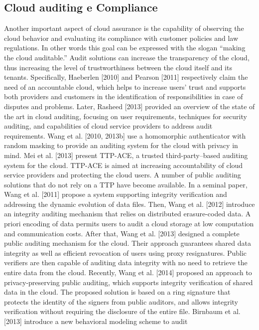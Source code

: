 \documentclass[../main.tex]{subfiles}
\begin{document}
\subsection {Cloud auditing e Compliance}
Another important aspect of cloud assurance is the capability of observing the cloud
behavior and evaluating its compliance with customer policies and law regulations. In
other words this goal can be expressed with the slogan “making the cloud auditable.”
Audit solutions can increase the transparency of the cloud, thus increasing the level of
trustworthiness between the cloud itself and its tenants. Specifically, Haeberlen [2010]
and Pearson [2011] respectively claim the need of an accountable cloud, which helps to
increase users’ trust and supports both providers and customers in the identification
of responsibilities in case of disputes and problems. Later, Rasheed [2013] provided
an overview of the state of the art in cloud auditing, focusing on user requirements,
techniques for security auditing, and capabilities of cloud service providers to address
audit requirements.
Wang et al. [2010, 2013b] use a homomorphic authenticator with random masking to
provide an auditing system for the cloud with privacy in mind. Mei et al. [2013] present
TTP-ACE, a trusted third-party–based auditing system for the cloud. TTP-ACE is
aimed at increasing accountability of cloud service providers and protecting the cloud
users. A number of public auditing solutions that do not rely on a TTP have become
available. In a seminal paper, Wang et al. [2011] propose a system supporting integrity
verification and addressing the dynamic evolution of data files. Then, Wang et al. [2012]
introduce an integrity auditing mechanism that relies on distributed erasure-coded
data. A priori encoding of data permits users to audit a cloud storage at low computation
and communication costs. After that, Wang et al. [2013] designed a complete public
auditing mechanism for the cloud. Their approach guarantees shared data integrity as
well as efficient revocation of users using proxy resignatures. Public verifiers are then
capable of auditing data integrity with no need to retrieve the entire data from the
cloud. Recently, Wang et al. [2014] proposed an approach to privacy-preserving public
auditing, which supports integrity verification of shared data in the cloud. The proposed
solution is based on a ring signature that protects the identity of the signers from public
auditors, and allows integrity verification without requiring the disclosure of the entire
file. Birnbaum et al. [2013] introduce a new behavioral modeling scheme to audit
\end{document}
